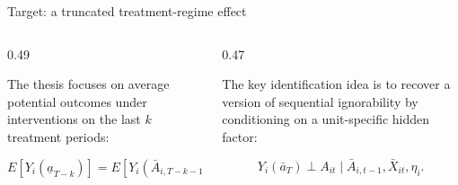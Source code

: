 \documentclass[aspectratio=169,12pt]{beamer}
\newcommand{\arrowtext}[1]{\par\vspace{0.45em}\noindent{\fontsize{10}{12}\selectfont $\to$}\hspace{0.45em}{#1}\par}
\newcommand{\spacedparagraph}[1]{\par\noindent\begin{minipage}{0.96\linewidth}\RaggedRight #1\end{minipage}\par\vspace{0.55em}}
\begin{document}
\begin{frame}{Target: a truncated treatment-regime effect}
\begin{columns}[T,onlytextwidth]
\begin{column}{0.49\textwidth}
\spacedparagraph{The thesis focuses on average potential outcomes under interventions on the last \(k\) treatment periods:}
\[
E[Y_i(\underline{a}_{T-k})]
=E[Y_i(\bar A_{i,T-k-1},\underline{a}_{T-k})].
\]

\end{column}
\begin{column}{0.47\textwidth}
\spacedparagraph{The key identification idea is to recover a version of sequential ignorability by conditioning on a unit-specific hidden factor:}
\[
Y_i(\bar{a}_T) \perp A_{it}\mid \bar A_{i,t-1},\bar {X}_{it},\eta_i .
\]
\vspace{-0.1cm}
\arrowtext{\(\eta_i=\alpha_i\) for FE-MSM.}
\arrowtext{\(\eta_i=Z_i\) for SeqGPLVM-MSM.}
\end{column}
\end{columns}
\end{frame}
\end{document}
